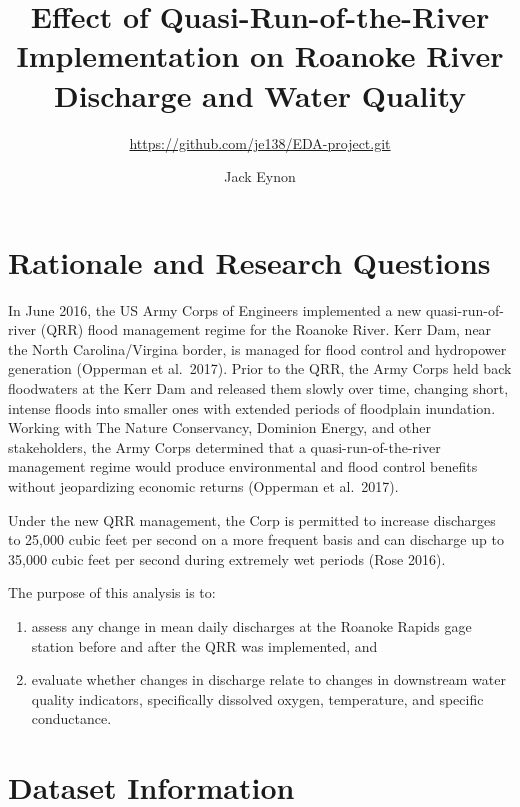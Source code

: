 \documentclass[12pt,]{article}
\title{Effect of Quasi-Run-of-the-River Implementation on Roanoke River
Discharge and Water Quality}
\subtitle{\url{https://github.com/je138/EDA-project.git}}
\author{Jack Eynon}
\date{}
\begin{document}
\maketitle

\newpage
\tableofcontents 
\newpage
\listoftables 
\newpage
\listoffigures 
\newpage

\hypertarget{rationale-and-research-questions}{%
\section{Rationale and Research
Questions}\label{rationale-and-research-questions}}

In June 2016, the US Army Corps of Engineers implemented a new
quasi-run-of-river (QRR) flood management regime for the Roanoke River.
Kerr Dam, near the North Carolina/Virgina border, is managed for flood
control and hydropower generation (Opperman et al.~2017). Prior to the
QRR, the Army Corps held back floodwaters at the Kerr Dam and released
them slowly over time, changing short, intense floods into smaller ones
with extended periods of floodplain inundation. Working with The Nature
Conservancy, Dominion Energy, and other stakeholders, the Army Corps
determined that a quasi-run-of-the-river management regime would produce
environmental and flood control benefits without jeopardizing economic
returns (Opperman et al.~2017).

Under the new QRR management, the Corp is permitted to increase
discharges to 25,000 cubic feet per second on a more frequent basis and
can discharge up to 35,000 cubic feet per second during extremely wet
periods (Rose 2016).

The purpose of this analysis is to:

\begin{enumerate}
\def\labelenumi{\arabic{enumi})}
\item
  assess any change in mean daily discharges at the Roanoke Rapids gage
  station before and after the QRR was implemented, and
\item
  evaluate whether changes in discharge relate to changes in downstream
  water quality indicators, specifically dissolved oxygen, temperature,
  and specific conductance.
\end{enumerate}

\newpage

\hypertarget{dataset-information}{%
\section{Dataset Information}\label{dataset-information}}
\end{document}
